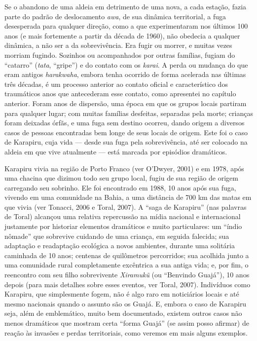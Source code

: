 Se o abandono de uma aldeia em detrimento de uma nova, a cada estação,
fazia parte do padrão de deslocamento \emph{awa}, de sua dinâmica
territorial, a fuga desesperada para qualquer direção, como a que
experimentaram nos últimos 100 anos (e mais fortemente a partir da
década de 1960), não obedecia a qualquer dinâmica, a não ser a da
sobrevivência. Era fugir ou morrer, e muitas vezes morriam fugindo.
Sozinhos ou acompanhados por outras famílias, fugiam do ``catarro''
(\emph{tata}, ``gripe'') e do contato com os \emph{karai}. A perda ou
mudança do que eram antigos \emph{harakwaha}, embora tenha ocorrido de
forma acelerada nas últimas três décadas, é um processo anterior ao
contato oficial e característico dos traumáticos anos que antecederam
esse contato, como apresentei no capítulo anterior. Foram anos de
dispersão, uma época em que os grupos locais partiram para qualquer
lugar; com muitas famílias desfeitas, separadas pela morte; crianças
foram deixadas órfãs, e uma fuga sem destino ocorreu, dando origem a
diversos casos de pessoas encontradas bem longe de seus locais de
origem. Este foi o caso de Karapiru, cuja vida --- desde sua fuga pela
sobrevivência, até ser colocado na aldeia em que vive atualmente --- está
marcada por episódios dramáticos.

Karapiru vivia na região de Porto Franco (ver O'Dwyer, 2001) e em 1978,
após uma chacina que dizimou todo seu grupo local, fugiu de sua região
de origem carregando seu sobrinho. Ele foi encontrado em 1988, 10 anos
após sua fuga, vivendo em uma comunidade na Bahia, a uma distância de
700 km das matas em que vivia (ver Tonacci, 2006 e Toral, 2007). A ``saga
de Karapiru'' (nas palavras de Toral) alcançou uma relativa repercussão
na mídia nacional e internacional justamente por historiar elementos
dramáticos e muito particulares: um ``índio nômade'' que sobrevive
cuidando de uma criança, em seguida falecida; sua adaptação e
readaptação ecológica a novos ambientes, durante uma solitária caminhada
de 10 anos; centenas de quilômetros percorridos; sua acolhida junto a
uma comunidade rural completamente excêntrica a sua antiga vida; e, por
fim, o reencontro com seu filho sobrevivente \emph{Xiramukũ} (ou
``Benvindo Guajá''), 10 anos depois (para mais detalhes sobre esses
eventos, ver Toral, 2007). Indivíduos como Karapiru, que simplesmente
fogem, não é algo raro em noticiários locais e até mesmo nacionais
quando o assunto são os Guajá. E, embora o caso de Karapiru seja, além
de emblemático, muito bem documentado, existem outros casos não menos
dramáticos que mostram certa ``forma Guajá'' (se assim posso afirmar) de
reação às invasões e perdas territoriais, como veremos em mais alguns
exemplos.

